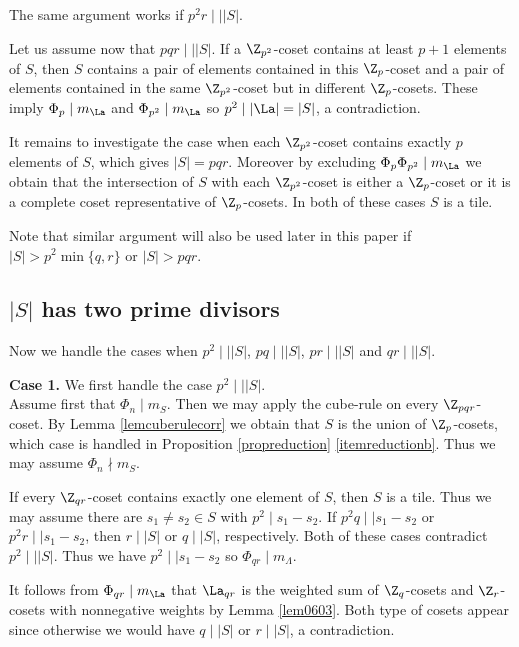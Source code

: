         The same argument works if $p^2r\mid\mid |S|$.
        
        Let us assume now that $pqr \mid \mid |S|$. If a $\Z_{p^2}$-coset contains at least $p+1$ elements of $S$, then $S$ contains a pair of elements contained in this $\Z_p$-coset and a pair of elements contained in the same $\Z_{p^2}$-coset but in different $\Z_p$-cosets. These imply $\Phi_p \mid m_{\La} $ and $\Phi_{p^2} \mid m_{\La} $ so $p^2 \mid |\La|=|S|$, a contradiction.  
        
        It remains to investigate the case when each $\Z_{p^2}$-coset contains exactly $p$ elements of $S$, which gives $|S|=pqr$. Moreover by excluding $\Phi_p \Phi_{p^2} \mid m_{\La}$ we obtain that 
        the intersection of $S$ with each $\Z_{p^2}$-coset is either a $\Z_p$-coset or it is a complete coset representative of $\Z_p$-cosets. In both of these cases $S$ is a tile. 
        
        Note that similar argument will also be used later in this paper if $|S|>p^2 \min \{q,r\}$ or $|S|>pqr$. 
        \subsection{$|S|$ has two prime divisors} Now we handle the cases when $p^2 \mid \mid |S|$, $pq \mid\mid |S|$, $pr \mid\mid |S|$ and $qr \mid\mid |S|$. 
        
        {\bf Case 1.} 
        We first handle the case $p^2 \mid \mid |S|$. \\
        Assume first that  $\Phi_n \mid m_S$. Then we may apply the cube-rule on every $\Z_{pqr}$-coset. By Lemma \ref{lemcuberulecorr}
        we obtain that $S$ is the union of $\Z_p$-cosets, which case is handled in Proposition \ref{propreduction}  \ref{itemreductionb}. Thus we may assume $\Phi_n \nmid m_S$.
        
        
        If every $\Z_{qr}$-coset contains exactly one element of $S$, then $S$ is a tile. Thus we may assume there are $s_1 \ne s_2 \in S$ with $p^2 \mid s_1-s_2$. If $p^2q \mid\mid s_1-s_2$ or $p^2r \mid\mid s_1-s_2$, then $r \mid |S|$ or $q \mid |S|$, respectively. Both of these cases contradict 
         $p^2 \mid \mid |S|$.
         Thus we have $p^2 \mid \mid s_1-s_2$ so $\Phi_{qr} \mid m_{\Lambda}$.
        
        
        
         It follows from $\Phi_{qr} \mid m_{\La}$ that $\La_{qr}$ is the weighted sum of $\Z_q$-cosets and $\Z_r$-cosets with nonnegative weights by Lemma \ref{lem0603}. Both type of cosets appear since otherwise 
        we would have $q  \mid |S|$ or $r  \mid |S|$, a contradiction. 
        
